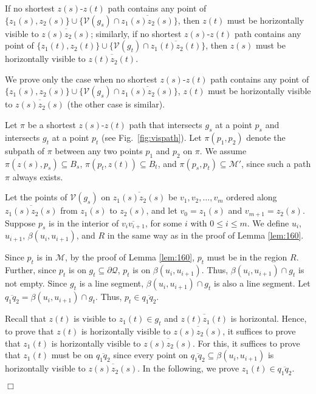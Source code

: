 \documentclass[english,runningheads,11pt]{llncs}
\def\calM{\mathcal{M}}
\def\calQ{\mathcal{Q}}
\def\calV{\mathcal{V}}
\newenvironment{proof}{\noindent {\textbf{Proof:}}\rm}{\hfill $\Box$\rm}
\begin{document}
\begin{lemma}\label{lem:190}
If no shortest $z(s)$-$z(t)$ path contains any point of
$\{z_1(s),z_2(s)\}\cup \{\calV(g_s)\cap \overline{z_1(s)z_2(s)}\}$, then
$z(t)$ must be horizontally visible to $\overline{z(s)z_2(s)}$;
similarly, if no shortest $z(s)$-$z(t)$ path contains any
point of $\{z_1(t),z_2(t)\}\cup \{\calV(g_t)\cap
\overline{z_1(t)z_2(t)}\}$, then $z(s)$ must be horizontally visible
to $\overline{z(t)z_2(t)}$.
\end{lemma}
\begin{proof}
We prove only the case when no shortest $z(s)$-$z(t)$
path contains any point of $\{z_1(s),z_2(s)\}\cup \{\calV(g_s)\cap \overline{z_1(s)z_2(s)}\}$,
$z(t)$ must be horizontally visible to $\overline{z(s)z_2(s)}$
(the other case is similar).


Let $\pi$ be a shortest $z(s)$-$z(t)$ path that intersects
$g_s$ at a point $p_s$ and intersects $g_t$ at a point $p_t$ (see
Fig.~\ref{fig:vispath}).  Let $\pi(p_1,p_2)$ denote
the subpath of $\pi$ between any two points $p_1$ and $p_2$ on $\pi$. We assume
$\pi(z(s),p_s)\subseteq B_s$, $\pi(p_t,z(t))\subseteq B_t$, and
$\pi(p_s,p_t)\subseteq \calM'$, since such a path $\pi$ always exists.

Let the points of $\calV(g_s)$ on $\overline{z_1(s)z_2(s)}$ be
$v_1,v_2,\ldots,v_m$ ordered along $\overline{z_1(s)z_2(s)}$ from $z_1(s)$ to
$z_2(s)$, and let $v_0=z_1(s)$ and $v_{m+1}=z_2(s)$.
Suppose $p_s$ is in the interior of
$\overline{v_iv_{i+1}}$, for some $i$ with $0\leq i\leq m$.
We define $u_i$, $u_{i+1}$, $\beta(u_i,u_{i+1})$, and $R$ in the same way
as in the proof of Lemma \ref{lem:160}.

Since $p_t$ is in $\calM$, by the proof of Lemma \ref{lem:160}, $p_t$
must be in the region $R$. Further, since $p_t$ is on $g_t\subseteq
\partial\calQ$, $p_t$ is on $\beta(u_i,u_{i+1})$. Thus,
$\beta(u_i,u_{i+1})\cap g_t$ is not empty. Since $g_t$ is a line segment,
$\beta(u_i,u_{i+1})\cap g_t$ is also a line segment.
Let $\overline{q_1q_2}=\beta(u_i,u_{i+1})\cap g_t$.
Thus, $p_t\in \overline{q_1q_2}$.

Recall that $z(t)$ is visible to $z_1(t)\in g_t$ and
$\overline{z(t)z_1(t)}$ is horizontal. Hence, to prove that
$z(t)$ is horizontally visible to $\overline{z(s)z_2(s)}$, it
suffices to prove that $z_1(t)$ is horizontally visible to
$\overline{z(s)z_2(s)}$. For this, it suffices to prove that $z_1(t)$ must
be on $\overline{q_1q_2}$ since every point on
$\overline{q_1q_2}\subseteq \beta(u_i,u_{i+1})$ is horizontally visible to
$\overline{z(s)z_2(s)}$. In the following, we prove $z_1(t)\in \overline{q_1q_2}$.



\end{proof}
\end{document}
